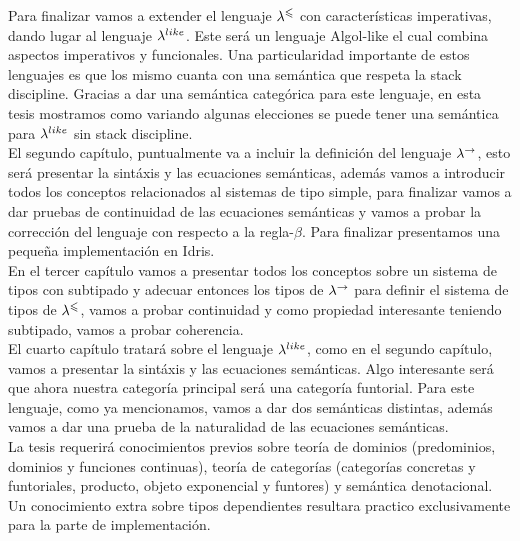 Para finalizar vamos a extender el lenguaje $\lambda^{\leqslant}$ con caracter\'isticas
imperativas, dando lugar al lenguaje $\lambda^{like}$. Este ser\'a un lenguaje 
Algol-like el cual combina aspectos imperativos y funcionales. Una particularidad
importante de estos lenguajes es que los mismo cuanta con una sem\'antica
que respeta la stack discipline. Gracias a dar una sem\'antica categ\'orica
para este lenguaje, en esta tesis mostramos como variando algunas elecciones
se puede tener una sem\'antica para $\lambda^{like}$ sin stack discipline.\\

El segundo cap\'itulo, puntualmente va a incluir la definici\'on del lenguaje
$\lambda^{\rightarrow}$, esto ser\'a presentar la sint\'axis y las ecuaciones
sem\'anticas, adem\'as vamos a introducir todos los conceptos relacionados al 
sistemas de tipo simple, para finalizar vamos a dar pruebas de
continuidad de las ecuaciones sem\'anticas y vamos a probar la correcci\'on
del lenguaje con respecto a la regla-$\beta$. Para finalizar presentamos
una pequeña implementaci\'on en Idris.\\

En el tercer cap\'itulo vamos a presentar todos los conceptos sobre
un sistema de tipos con subtipado y adecuar entonces los tipos de $\lambda^{\rightarrow}$
para definir el sistema de tipos de $\lambda^{\leqslant}$, vamos a probar
continuidad y como propiedad interesante teniendo subtipado, vamos a probar
coherencia.\\

El cuarto cap\'itulo tratar\'a sobre el lenguaje $\lambda^{like}$, como en el segundo
cap\'itulo, vamos a presentar la sint\'axis y las ecuaciones sem\'anticas. 
Algo interesante ser\'a que ahora nuestra categor\'ia principal ser\'a
una categor\'ia funtorial. Para
este lenguaje, como ya mencionamos, vamos a dar dos sem\'anticas distintas, adem\'as
vamos a dar una prueba de la naturalidad de las ecuaciones sem\'anticas.\\

La tesis requerir\'a conocimientos previos sobre teor\'ia de dominios 
(predominios, dominios y funciones continuas), teor\'ia
de categor\'ias (categor\'ias concretas y funtoriales, producto, 
objeto exponencial y funtores) y sem\'antica denotacional. Un
conocimiento extra sobre tipos dependientes resultara practico exclusivamente
para la parte de implementaci\'on.
